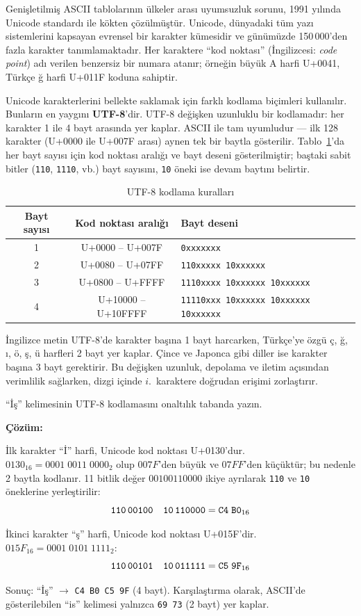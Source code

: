 Genişletilmiş ASCII tablolarının ülkeler arası uyumsuzluk sorunu, 1991 yılında Unicode standardı ile kökten çözülmüştür. Unicode, dünyadaki tüm yazı sistemlerini kapsayan evrensel bir karakter kümesidir ve günümüzde 150\,000'den fazla karakter tanımlamaktadır. Her karaktere ``kod noktası'' (İngilizcesi: \textit{code point}) adı verilen benzersiz bir numara atanır; örneğin büyük A harfi U+0041, Türkçe ğ harfi U+011F koduna sahiptir.

Unicode karakterlerini bellekte saklamak için farklı kodlama biçimleri kullanılır. Bunların en yaygını \textbf{UTF-8}'dir. UTF-8 değişken uzunluklu bir kodlamadır: her karakter 1 ile 4 bayt arasında yer kaplar. ASCII ile tam uyumludur --- ilk 128 karakter (U+0000 ile U+007F arası) aynen tek bir baytla gösterilir. Tablo~\ref{tab:utf8-kodlama}'da her bayt sayısı için kod noktası aralığı ve bayt deseni gösterilmiştir; baştaki sabit bitler (\texttt{110}, \texttt{1110}, vb.) bayt sayısını, \texttt{10} öneki ise devam baytını belirtir.

\begin{table}[H]
\centering
\caption{UTF-8 kodlama kuralları}
\label{tab:utf8-kodlama}
\begin{tabular}{ccl}
\toprule
\textbf{Bayt sayısı} & \textbf{Kod noktası aralığı} & \textbf{Bayt deseni} \\
\midrule
1 & U+0000 -- U+007F   & \texttt{0xxxxxxx} \\
2 & U+0080 -- U+07FF   & \texttt{110xxxxx 10xxxxxx} \\
3 & U+0800 -- U+FFFF   & \texttt{1110xxxx 10xxxxxx 10xxxxxx} \\
4 & U+10000 -- U+10FFFF & \texttt{11110xxx 10xxxxxx 10xxxxxx 10xxxxxx} \\
\bottomrule
\end{tabular}
\end{table}

İngilizce metin UTF-8'de karakter başına 1 bayt harcarken, Türkçe'ye özgü ç, ğ, ı, ö, ş, ü harfleri 2 bayt yer kaplar. Çince ve Japonca gibi diller ise karakter başına 3 bayt gerektirir. Bu değişken uzunluk, depolama ve iletim açısından verimlilik sağlarken, dizgi içinde $i$.~karaktere doğrudan erişimi zorlaştırır.

\begin{ornek}[A.23]
``İş'' kelimesinin UTF-8 kodlamasını onaltılık tabanda yazın.

\textbf{Çözüm:}

İlk karakter ``İ'' harfi, Unicode kod noktası U+0130'dur. $0130_{16} = 0001\;0011\;0000_2$ olup $007F$'den büyük ve $07FF$'den küçüktür; bu nedenle 2 baytla kodlanır. 11 bitlik değer $00100110000$ ikiye ayrılarak \texttt{110} ve \texttt{10} öneklerine yerleştirilir:
\[
\texttt{110\,00100\quad 10\,110000} = \texttt{C4\;B0}_{16}
\]

İkinci karakter ``ş'' harfi, Unicode kod noktası U+015F'dir. $015F_{16} = 0001\;0101\;1111_2$:
\[
\texttt{110\,00101\quad 10\,011111} = \texttt{C5\;9F}_{16}
\]

Sonuç: ``İş'' $\rightarrow$ \texttt{C4 B0 C5 9F} (4 bayt). Karşılaştırma olarak, ASCII'de gösterilebilen ``is'' kelimesi yalnızca \texttt{69 73} (2 bayt) yer kaplar.
\end{ornek}


